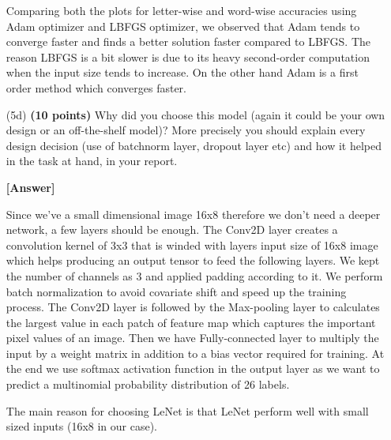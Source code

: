 \documentclass[11pt]{report}
\begin{document}
\begin{itemize}
{           
Comparing both the plots for letter-wise and word-wise accuracies using Adam optimizer and LBFGS optimizer, we observed that Adam tends to converge faster and finds a better solution faster compared to LBFGS. The reason LBFGS is a bit slower is due to its heavy second-order computation when the input size tends to increase. On the other hand  Adam is a first order method which converges faster. 
            }



\item[(5d)] {\textbf{(10 points)} Why did you choose this model (again it could
  be your own design or an off-the-shelf model)? More precisely you should
  explain every design decision (use of batchnorm layer, dropout layer etc) and
  how it helped in the task at hand, in your report.}

\item[\textbf{ [Answer] } ]{
Since we've a small dimensional image 16x8 therefore we don't need a deeper network, a few layers should be enough. The Conv2D layer creates a convolution kernel of 3x3 that is winded with layers input size of 16x8 image which helps producing an output tensor to feed the following layers. We kept the number of channels as 3 and applied padding according to it. We perform batch normalization to avoid covariate shift and speed up the training process. The Conv2D layer is followed by the Max-pooling layer to calculates the largest value in each patch of feature map which captures the important pixel values of an image. Then we have Fully-connected layer to multiply the input by a weight matrix in addition to a bias vector required for training. At the end we use softmax activation function in the output layer as we want to predict a multinomial probability distribution of 26 labels. 

The main reason for choosing LeNet is that LeNet perform well with small sized inputs (16x8 in our case). 
}

\end{itemize}




 
\label{sec:appdxconvfilters}
\end{document}
